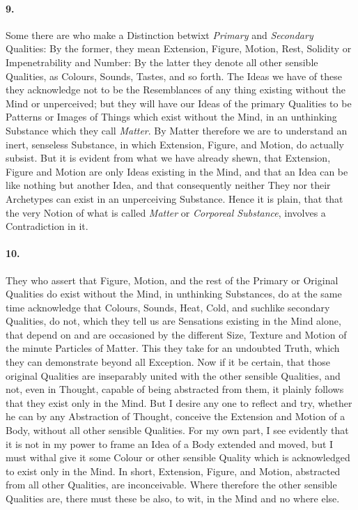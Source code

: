 \documentclass[]{article}
\newenvironment{sectionbody}{}{}
\begin{document}
\begin{sectionbody}
\paragraph{9.} Some there are who make a Distinction betwixt \emph{Primary}
and \emph{Secondary} Qualities: By the former, they mean
Extension, Figure, Motion, Rest, Solidity or Impenetrability and
Number: By the latter they denote all other sensible Qualities,
as Colours, Sounds, Tastes, and so forth.  The Ideas we have of
these they acknowledge not to be the Resemblances of any thing
existing without the Mind or unperceived; but they will have our
Ideas of the primary Qualities to be Patterns or Images of Things
which exist without the Mind, in an unthinking Substance which
they call \emph{Matter}.  By Matter therefore we are to
understand an inert, senseless Substance, in which Extension,
Figure, and Motion, do actually subsist.  But it is evident from
what we have already shewn, that Extension, Figure and Motion are
only Ideas existing in the Mind, and that an Idea can be like
nothing but another Idea, and that consequently neither They nor
their Archetypes can exist in an unperceiving Substance.  Hence
it is plain, that that the very Notion of what is called
\emph{Matter} or \emph{Corporeal Substance}, involves a
Contradiction in it.



\paragraph{10.} They who assert that Figure, Motion, and the rest of the Primary
or Original Qualities do exist without the Mind, in unthinking
Substances, do at the same time acknowledge that Colours, Sounds,
Heat, Cold, and suchlike secondary Qualities, do not, which they
tell us are Sensations existing in the Mind alone, that depend on
and are occasioned by the different Size, Texture and Motion of
the minute Particles of Matter.  This they take for an undoubted
Truth, which they can demonstrate beyond all Exception.  Now if
it be certain, that those original Qualities are inseparably
united with the other sensible Qualities, and not, even in
Thought, capable of being abstracted from them, it plainly
follows that they exist only in the Mind.  But I desire any one
to reflect and try, whether he can by any Abstraction of Thought,
conceive the Extension and Motion of a Body, without all other
sensible Qualities.  For my own part, I see evidently that it is
not in my power to frame an Idea of a Body extended and moved,
but I must withal give it some Colour or other sensible Quality
which is acknowledged to exist only in the Mind.  In short,
Extension, Figure, and Motion, abstracted from all other
Qualities, are inconceivable.  Where therefore the other sensible
Qualities are, there must these be also, to wit, in the Mind and
no where else.




\end{sectionbody}
\end{document}
